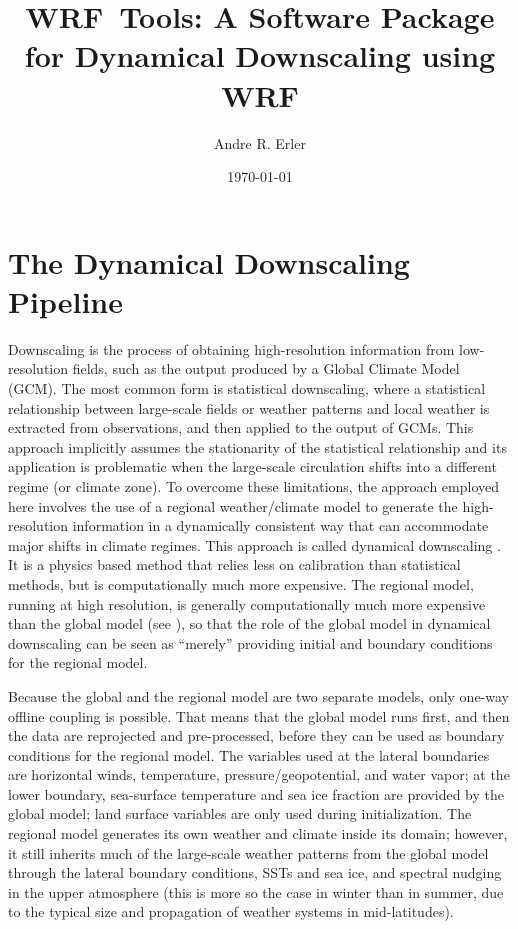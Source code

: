 \documentclass[letterpaper,12pt,headsepline,final]{scrartcl} %
\title{WRF~Tools: A Software Package for Dynamical Downscaling using WRF}
\author{Andre R. Erler}
\date{\today}
\begin{document}
\maketitle

\section{The Dynamical Downscaling Pipeline}
\label{pipeline}
Downscaling is the process of obtaining high-resolution information from low-resolution fields, such as the output produced by a Global Climate Model (GCM). The most common form is statistical downscaling, where a statistical relationship between large-scale fields or weather patterns and local weather is extracted from observations, and then applied to the output of GCMs. This approach implicitly assumes the stationarity of the statistical relationship and its application is problematic when the large-scale circulation shifts into a different regime (or climate zone). To overcome these limitations, the approach employed here involves the use of a regional weather/climate model to generate the high-resolution information in a dynamically consistent way that can accommodate major shifts in climate regimes. This approach is called dynamical downscaling \citep{giorgi2006downscaling,maraun2010downscaling}. It is a physics based method that relies less on calibration than statistical methods, but is computationally much more expensive. The regional model, running at high resolution, is generally computationally much more expensive than the global model (see \citealp[][\S2.1.5]{erler2015phd}), so that the role of the global model in dynamical downscaling can be seen as ``merely'' providing initial and boundary conditions for the regional model.

Because the global and the regional model are two separate models, only one-way offline coupling is possible. That means that the global model runs first, and then the data are reprojected and pre-processed, before they can be used as boundary conditions for the regional model. The variables used at the lateral boundaries are horizontal winds, temperature, pressure/geopotential, and water vapor; at the lower boundary, sea-surface temperature and sea ice fraction are provided by the global model; land surface variables are only used during initialization. The regional model generates its own weather and climate inside its domain; however, it still inherits much of the large-scale weather patterns from the global model through the lateral boundary conditions, SSTs and sea ice, and spectral nudging in the upper atmosphere (this is more so the case in winter than in summer, due to the typical size and propagation of weather systems in mid-latitudes).
\end{document}
